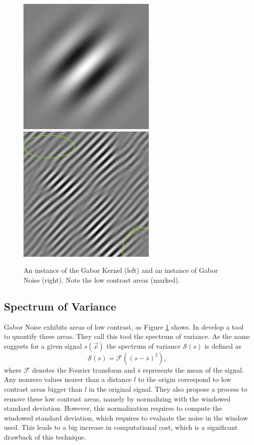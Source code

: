 \documentclass{utue} %
\begin{document}
\begin{figure}[ht]
  \centering
  \includegraphics[width=0.45\linewidth]{images/gaborKernel}
  \includegraphics[width=0.45\linewidth]{images/gaborNoise}
  \caption{An instance of the Gabor Kernel (left) and an instance of Gabor Noise (right). Note the low contrast areas (marked).}\label{fig:gaborNoise}

\end{figure}

\subsection{Spectrum of Variance}
Gabor Noise exhibits areas of low contrast, as Figure \ref{fig:gaborNoise} shows. In \cite{spectrumOfVariance} \citeauthor{spectrumOfVariance} develop a tool to quantify these areas. They call this tool the spectrum of variance. As the name suggests for a given signal $s(\vec{x})$ the spectrum of variance $\mathcal{S}(s)$ is defined as
$$
\mathcal{S}(s) = \mathcal{F}((s-\overline{s})^2),
$$
where $\mathcal{F}$ denotes the Fourier transform and $\overline{s}$ represents the mean of the signal. Any nonzero values nearer than a distance $l$ to the origin correspond to low contrast areas bigger than $l$ in the original signal. They also propose a process to remove these low contrast areas, namely by normalizing with the windowed standard deviation. However, this normalization requires to compute the windowed standard deviation, which requires to evaluate the noise in the window used. This leads to a big increase in computational cost, which is a significant drawback of this technique.
\end{document}

